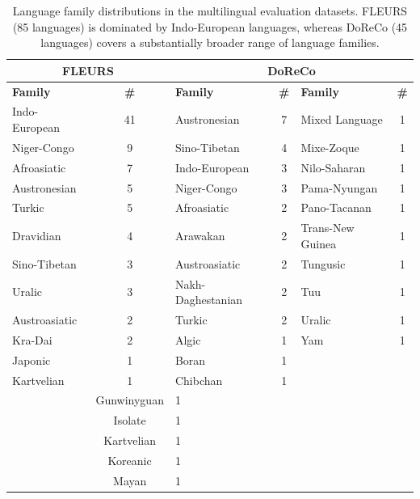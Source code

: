 \begin{table}[t]
\centering
\scriptsize
\setlength{\tabcolsep}{4pt}

\begin{tabular}{lc|lclc}
\toprule
\multicolumn{2}{c|}{\textbf{FLEURS}} &
\multicolumn{4}{c}{\textbf{DoReCo}}\\
\midrule
\textbf{Family} & \textbf{\#} &
\textbf{Family} & \textbf{\#} &
\textbf{Family} & \textbf{\#} \\
\midrule
Indo-European & 41 &
Austronesian & 7 &
Mixed Language & 1 \\
Niger-Congo & 9 &
Sino-Tibetan & 4 &
Mixe-Zoque & 1 \\
Afroasiatic & 7 &
Indo-European & 3 &
Nilo-Saharan & 1 \\
Austronesian & 5 &
Niger-Congo & 3 &
Pama-Nyungan & 1 \\
Turkic & 5 &
Afroasiatic & 2 &
Pano-Tacanan & 1 \\
Dravidian & 4 &
Arawakan & 2 &
Trans-New Guinea & 1 \\
Sino-Tibetan & 3 &
Austroasiatic & 2 &
Tungusic & 1 \\
Uralic & 3 &
Nakh-Daghestanian & 2 &
Tuu & 1 \\
Austroasiatic & 2 &
Turkic & 2 &
Uralic & 1 \\
Kra-Dai & 2 &
Algic & 1 &
Yam & 1 \\
Japonic & 1 &
Boran & 1 & \\
Kartvelian & 1 &
Chibchan & 1 & \\
&
Gunwinyguan & 1 & \\
&
Isolate & 1 & \\
&
Kartvelian & 1 & \\
&
Koreanic & 1 & \\
&
Mayan & 1 & \\
\bottomrule
\end{tabular}

\caption{Language family distributions in the multilingual evaluation datasets. FLEURS (85 languages) is dominated by Indo-European languages, whereas DoReCo (45 languages) covers a substantially broader range of language families.}
\label{tab:family_stats}
\end{table}